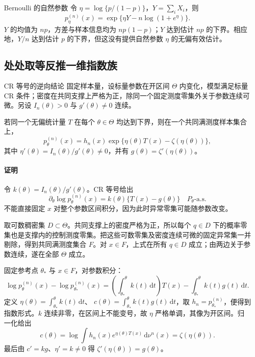 \begin{examplebox}{Bernoulli 的自然参数}
令 $\eta=\log\{p/(1-p)\}$，$Y=\sum_iX_i$，则
\[
 p_\eta^{(n)}(x)=\exp\{\eta Y-n\log(1+e^\eta)\}.
\]
$Y$ 的均值为 $np$，方差与样本信息均为 $np(1-p)$；$Y$ 达到估计 $np$ 的下界。相应地，$Y/n$ 达到估计 $p$ 的下界，但这没有提供自然参数 $\eta$ 的无偏有效估计。
\end{examplebox}

\subsection{处处取等反推一维指数族}
\begin{definitionbox}{CR 等号的逆向结论}
固定样本量，设标量参数在开区间 $\Theta$ 内变化，模型满足标量 CR 条件；密度在共同支撑上严格为正，除同一个固定测度零集外关于参数连续可微。另设 $I_n(\theta)>0$ 与 $g'(\theta)\ne0$ 连续。

若同一个无偏统计量 $T$ 在每个 $\theta\in\Theta$ 均达到下界，则在一个共同满测度样本集合上，
\[
 p_\theta^{(n)}(x)
 =h_n(x)\exp\{\eta(\theta)T(x)-\zeta(\eta(\theta))\},
\]
其中 $\eta'(\theta)=I_n(\theta)/g'(\theta)\ne0$，并有
$g(\theta)=\zeta'(\eta(\theta))$。
\end{definitionbox}

\paragraph{证明}
令 $k(\theta)=I_n(\theta)/g'(\theta)$。CR 等号给出
\[
 \partial_\theta\log p_\theta^{(n)}(x)
 =k(\theta)\{T(x)-g(\theta)\}
 \quad P_\theta\text{-a.s.}
\]
不能直接固定 $x$ 对整个参数区间积分，因为此时异常零集可能随参数改变。

取可数稠密集 $D\subset\Theta$。共同支撑上的密度严格为正，所以每个 $q\in D$ 下的概率零集也是支撑内的控制测度零集。把这些可数零集及密度连续可微的固定异常集一并剔除，得到共同满测度集合 $F$。对 $x\in F$，上式在所有 $q\in D$ 成立；由两边关于参数连续，遂在全部 $\Theta$ 成立。

固定参考点 $\theta_*$ 与 $x\in F$，对参数积分：
\[
 \log p_\theta^{(n)}(x)-\log p_{\theta_*}^{(n)}(x)
 =\left(\int_{\theta_*}^\theta k(t)\,\mathrm dt\right)T(x)
 -\int_{\theta_*}^\theta k(t)g(t)\,\mathrm dt.
\]
定义 $\eta(\theta)=\int_{\theta_*}^\theta k(t)\,\mathrm dt$、
$c(\theta)=\int_{\theta_*}^\theta k(t)g(t)\,\mathrm dt$，取
$h_n=p_{\theta_*}^{(n)}$，便得到指数形式。$k$ 连续非零，在区间上不能变号，故 $\eta$ 严格单调，其像为开区间。归一化给出
\[
 c(\theta)=\log\int h_n(x)e^{\eta(\theta)T(x)}\,\mathrm d\nu^n(x)
 =\zeta(\eta(\theta)).
\]
最后由 $c'=kg$、$\eta'=k\ne0$ 得 $\zeta'(\eta(\theta))=g(\theta)$。

